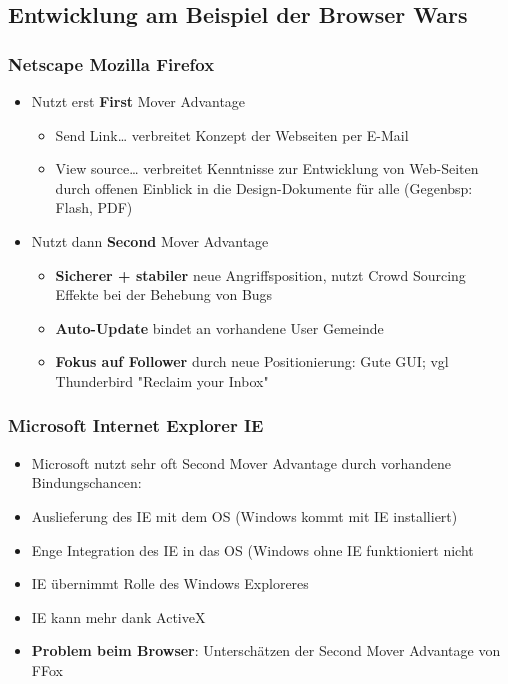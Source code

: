 \documentclass{article} %
\begin{document}
	\subsection{Entwicklung am Beispiel der Browser Wars}
		\subsubsection{Netscape Mozilla Firefox}
		\begin{itemize}
			\item Nutzt erst \textbf{First} Mover Advantage
			\begin{itemize}
				\item Send Link… verbreitet Konzept der Webseiten per E-Mail
				\item View source… verbreitet Kenntnisse zur Entwicklung von Web-Seiten durch offenen Einblick in die Design-Dokumente für alle (Gegenbsp: Flash, PDF)
			\end{itemize}
			\item Nutzt dann \textbf{Second} Mover Advantage
			\begin{itemize}
				\item \textbf{Sicherer + stabiler} neue Angriffsposition, nutzt Crowd Sourcing Effekte bei der Behebung von Bugs
				\item \textbf{Auto-Update} bindet an vorhandene User Gemeinde
				\item \textbf{Fokus auf Follower} durch neue Positionierung: Gute GUI; vgl Thunderbird
"Reclaim your Inbox"
			\end{itemize}
		\end{itemize}
		\subsubsection{Microsoft Internet Explorer IE}
		\begin{itemize}
			\item Microsoft nutzt sehr oft Second Mover Advantage durch vorhandene Bindungschancen:
			\item Auslieferung des IE mit dem OS (Windows kommt mit IE installiert)
			\item Enge Integration des IE in das OS (Windows ohne IE funktioniert nicht
			\item IE übernimmt Rolle des Windows Exploreres
			\item IE kann mehr dank ActiveX
			\item \textbf{Problem beim Browser}: Unterschätzen der Second Mover Advantage von FFox
		\end{itemize}
\end{document}
